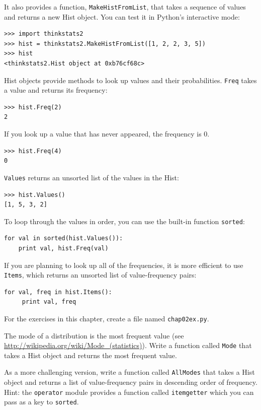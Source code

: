 \documentclass[12pt]{book}
\begin{document}
It also provides a function, {\tt MakeHistFromList}, that takes a
sequence of values and returns a new Hist object.  You can test it in
Python's interactive mode:
%
\begin{verbatim}
>>> import thinkstats2
>>> hist = thinkstats2.MakeHistFromList([1, 2, 2, 3, 5])
>>> hist
<thinkstats2.Hist object at 0xb76cf68c>
\end{verbatim}

Hist objects provide methods to look up values and their
probabilities.  {\tt Freq} takes a value and returns its frequency:
%
\begin{verbatim}
>>> hist.Freq(2)
2
\end{verbatim}

If you look up a value that has never appeared, the frequency is 0.
%
\begin{verbatim}
>>> hist.Freq(4)
0
\end{verbatim}

{\tt Values} returns an unsorted list of the values in the Hist:
%
\begin{verbatim}
>>> hist.Values()
[1, 5, 3, 2]
\end{verbatim}

To loop through the values in order, you can use the built-in function
{\tt sorted}:
%
\begin{verbatim}
for val in sorted(hist.Values()):
    print val, hist.Freq(val)
\end{verbatim}

If you are planning to look up all of the frequencies, it is more
efficient to use {\tt Items}, which returns an unsorted list of
value-frequency pairs:
%
\begin{verbatim}
for val, freq in hist.Items():
     print val, freq
\end{verbatim}

\begin{exercise}
For the exercises in this chapter, create a file named
{\tt chap02ex.py}.

The mode of a distribution is the most frequent value (see
\url{http://wikipedia.org/wiki/Mode_(statistics)}).  Write a function
called {\tt Mode} that takes a Hist object and returns the most
frequent value.

As a more challenging version, write a function called {\tt AllModes}
that takes a Hist object and returns a list of value-frequency
pairs in descending order of frequency.  Hint: the {\tt operator}
module provides a function called {\tt itemgetter} which you can
pass as a key to {\tt sorted}.
\end{exercise}
\end{document}
